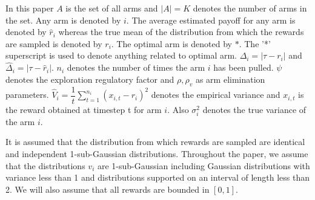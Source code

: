 In this paper $A$ is the set of all arms and $|A|=K$ denotes the number of arms in the set. Any arm is denoted by $i$. The average estimated payoff for any arm is denoted by $\hat{r}_{i}$ whereas the true mean of the distribution from which the rewards are sampled is denoted by $r_{i}$. The optimal arm is denoted by $*$. The '*' superscript is used to denote anything related to optimal arm.  $\Delta_{i}=|\tau-r_{i}|$ and $\hat{\Delta}_{i}=|\tau-\hat{r}_{i}|$.  $n_{i}$ denotes the number of times the arm $i$ has been pulled. $\psi $ denotes the exploration regulatory factor and $\rho,\rho_v$ as arm elimination parameters. $\hat{V}_{i}=\dfrac{1}{t}\sum_{t=1}^{n_{i}}(x_{i,t}-r_{i})^{2}$ denotes the empirical variance and $x_{i,t}$ is the reward obtained at timestep t for arm $i$. Also  $\sigma_{i}^{2}$ denotes the true variance of the arm $i$.
	
	It is assumed that the distribution from which rewards are sampled are identical and independent 1-sub-Gaussian distributions. Throughout the paper, we assume that the distributions $v_{i}$ are 1-sub-Gaussian including Gaussian distributions with variance less than 1 and distributions supported on an interval of length less than 2. We will also assume that all rewards are bounded in $[0,1]$.

